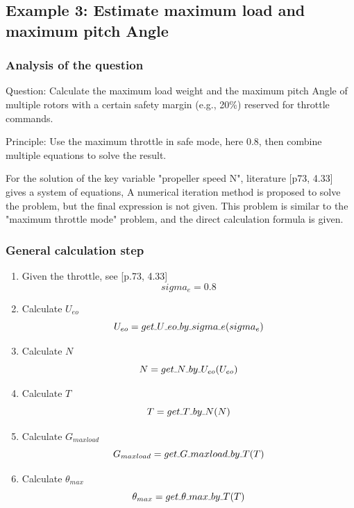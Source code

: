 \documentclass{article} %
\numberwithin{equation}{section} %
\newcommand{\SL}{\rule{.3em}{.3pt}} %
\begin{document}
\subsection{Example 3: Estimate maximum load and maximum pitch Angle}

\subsubsection{Analysis of the question}
Question: Calculate the maximum load weight and the maximum pitch Angle of multiple rotors with a certain safety margin (e.g., 20\%) reserved for throttle commands.

Principle: Use the maximum throttle in safe mode, here 0.8, then combine multiple equations to solve the result.

For the solution of the key variable "propeller speed N", literature \cite{qq}[p73, 4.33] gives a system of equations,
A numerical iteration method is proposed to solve the problem, but the final expression is not given.
This problem is similar to the "maximum throttle mode" problem, and the direct calculation formula is given.

\subsubsection{General calculation step}

\begin{enumerate}

\item Given the throttle, see \cite{qq}[p.73, 4.33]
\begin{equation}
sigma_e = 0.8 \label{q_maxload.sigma_e}
\end{equation}

\item Calculate $U_{eo}$
\begin{equation}
U_{eo} = get\SL U\SL eo\SL by\SL sigma\SL e (sigma_e) \label{q_maxload.U_eo}
\end{equation}

\item Calculate $N$
\begin{equation}
N = get\SL N\SL by\SL U_{eo} (U_{eo}) \label{q_maxload.N}
\end{equation}

\item Calculate $T$
\begin{equation}
T = get\SL T\SL by\SL N (N) \label{q_maxload.T}
\end{equation}

\item Calculate $G_{maxload}$
\begin{equation}
G_{maxload} = get\SL G\SL maxload\SL by\SL T (T) \label{q_maxload.G_maxload}
\end{equation}

\item Calculate $\theta_{max}$
\begin{equation}
\theta_{max} = get\SL \theta\SL max\SL by\SL T (T) \label{q_maxload.theta_max}
\end{equation}

\end{enumerate}
\end{document}

